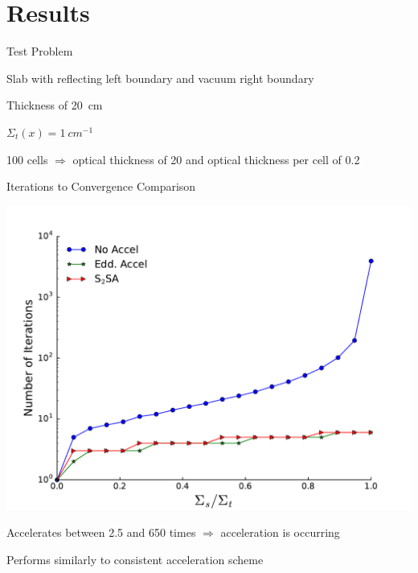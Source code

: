 \documentclass[10pt]{beamer}
\begin{document}
\section{Results}

\begin{frame}{Test Problem} 

	Slab with reflecting left boundary and vacuum right boundary 

    Thickness of \SI{20}{cm} 

    $\Sigma_t(x) = \SI{1}{cm^{-1}}$

    100 cells $\Rightarrow$ optical thickness of 20 and optical thickness per cell of 0.2 

\end{frame}

\begin{frame}{Iterations to Convergence Comparison}

    \centerline{\includegraphics[width=.7\paperwidth]{accel.pdf}}

    Accelerates between 2.5 and 650 times $\Rightarrow$ acceleration is occurring 

    Performs similarly to consistent acceleration scheme 

\end{frame}
\end{document}
